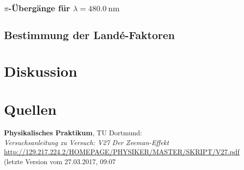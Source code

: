 \documentclass[captions=tableheading]{scrartcl}
\begin{document}
\subsubsection{$\pi$-Übergänge für $\lambda=\SI{480.0}{\nano\metre}$}

\subsection{Bestimmung der Landé-Faktoren}


\section{Diskussion}

\section{Quellen}
\begin{enumerate}[label={[\arabic*]}]
\item \label{q:anleitung} \textbf{Physikalisches Praktikum}, TU Dortmund: \\
\textit{Versuchsanleitung zu Versuch: V27 Der Zeeman-Effekt} \\
\url{http://129.217.224.2/HOMEPAGE/PHYSIKER/MASTER/SKRIPT/V27.pdf} (letzte Version vom 27.03.2017, 09:07
\end{enumerate}
\end{document}
